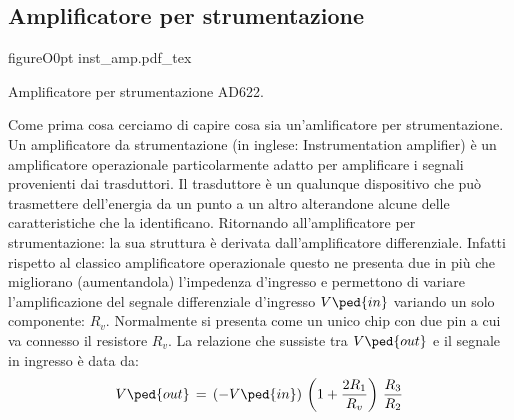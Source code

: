 \subsection*{Amplificatore per strumentazione}

\begin{wrapfloat}{figure}{O}{0pt}
        \def\svgwidth{0.5\textwidth}
        {inst_amp.pdf_tex}
        \caption{Amplificatore per strumentazione AD622.}
        \label{fig:inst_amp}
\end{wrapfloat}

Come prima cosa cerciamo di capire cosa sia un'amlificatore per strumentazione.
Un amplificatore da strumentazione (in inglese: Instrumentation amplifier) è un amplificatore operazionale particolarmente adatto per amplificare i segnali provenienti dai trasduttori. Il trasduttore è un qualunque dispositivo che può trasmettere dell'energia da un punto a un altro alterandone alcune delle caratteristiche che la identificano.
Ritornando all'amplificatore per strumentazione: la sua struttura è derivata dall'amplificatore differenziale. Infatti rispetto al classico amplificatore operazionale questo ne presenta due in più che migliorano (aumentandola) l'impedenza d'ingresso e permettono di variare l'amplificazione del segnale differenziale d'ingresso $V\ped{in}$  variando un solo componente: $R_v$. Normalmente si presenta come un unico chip con due pin a cui va connesso il resistore $R_v$.
La relazione che sussiste tra $V\ped{out}$ e il segnale in ingresso è data da:
\begin{equation}
        V\ped{out}\,=\,(-V\ped{in})\,\left(1 + \frac{2R_1}{R_v}\right)\,\frac{R_3}{R_2}
\end{equation}

